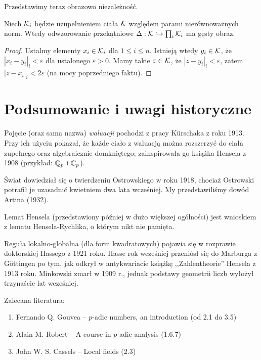 Przedstawimy teraz obrazowo niezależność.

\begin{fakt}
	Niech $\mathcal K_i$ będzie uzupełnieniem ciała $\mathcal K$ względem parami nierównoważnych norm.
	Wtedy odwzorowanie przekątniowe $\Delta: \mathcal K \hookrightarrow \prod_i \mathcal K_i$ ma gęsty obraz.
\end{fakt}

\begin{proof}
	Ustalmy elementy $x_i \in \mathcal K_i$ dla $1 \le i \le n$.
	Istnieją wtedy $y_i \in \mathcal K$, że $|x_i-y_i|_i < \varepsilon$ dla ustalonego $\varepsilon > 0$.
	Mamy takie $z \in \mathcal K$, że $|z - y_i|_i < \varepsilon$, zatem $|z - x_i|_i < 2 \varepsilon$ (na mocy poprzedniego faktu).
\end{proof}

\section{Podsumowanie i uwagi historyczne}
Pojęcie (oraz sama nazwa) \emph{waluacji} pochodzi z pracy Kürschaka z roku 1913.
Przy ich użyciu pokazał, że każde ciało z waluacją można rozszerzyć do ciała zupełnego oraz algebraicznie domkniętego; zainspirowała go książka Hensela z 1908 (przykład: $\mathbb Q_p$ i $\mathbb C_p$).

Świat dowiedział się o twierdzeniu Ostrowskiego w roku 1918, chociaż Ostrowski potrafił je uzasadnić kwietniem dwa lata wcześniej.
My przedstawiliśmy dowód Artina (1932).

Lemat Hensela (przedstawiony później w dużo większej ogólności) jest wnioskiem z lematu Hensela-Rychlika, o którym nikt nie pamięta.

Reguła lokalno-globalna (dla form kwadratowych) pojawia się w rozprawie doktorskiej Hassego z 1921 roku.
Hasse rok wcześniej przeniósł się do Marburga z Göttingen po tym, jak odkrył w antykwariacie książkę ,,Zahlentheorie'' Hensela z 1913 roku.
Minkowski zmarł w 1909 r., jednak podstawy geometrii liczb wyłożył trzynaście lat wcześniej.

Zalecana literatura:

\begin{enumerate}
	\item Fernando Q. Gouvea -- $p$-adic numbers, an introduction (od 2.1 do 3.5)
	\item Alain M. Robert -- A course in $p$-adic analysis (1.6.7)
	\item John W. S. Cassels -- Local fields (2.3)
\end{enumerate}